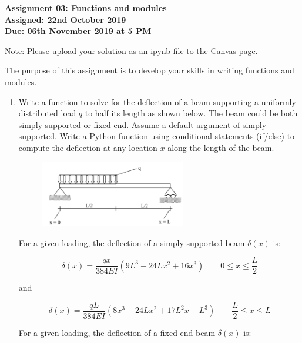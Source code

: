 \documentclass[a4paper,12pt]{article}
\begin{document}
\begin{centering}
	\textbf{
		Assignment 03: Functions and modules\\
		Assigned: 22nd October 2019\\
		Due: 06th November 2019 at 5 PM\\
	}
\end{centering}


Note: Please upload your solution as an ipynb file to the Canvas page.

\vspace{1em}
 
 The purpose of this assignment is to develop your skills in writing functions and modules.
 
\begin{enumerate}
	
	\item Write a function to solve for the deflection of a beam supporting a uniformly distributed load $q$ to half its length as shown below. The beam could be both simply supported or fixed end. Assume a default argument of simply supported. Write a Python function using conditional statements (if/else) to compute the deflection at any location $x$ along the length of the beam.

	\begin{figure}[ht]
		\centering
		\includegraphics[width=0.6\textwidth]{ss-beam.png}
	\end{figure}

	For a given loading, the deflection of a simply supported beam $\delta(x)$ is:
	
	\begin{equation*}
		\delta(x) = \frac{q x}{384EI}(9L^3 - 24Lx^2 + 16x^3) \qquad 0 \le x \le \frac{L}{2}
	\end{equation*}
	
	and 

	\begin{equation*}
	\delta(x) = \frac{q L}{384EI}(8x^3 - 24Lx^2 + 17L^2x -L^3) \qquad \frac{L}{2} \le x \le L
	\end{equation*}
	
	For a given loading, the deflection of a fixed-end beam $\delta(x)$ is:
	

\end{enumerate}
\end{document}
